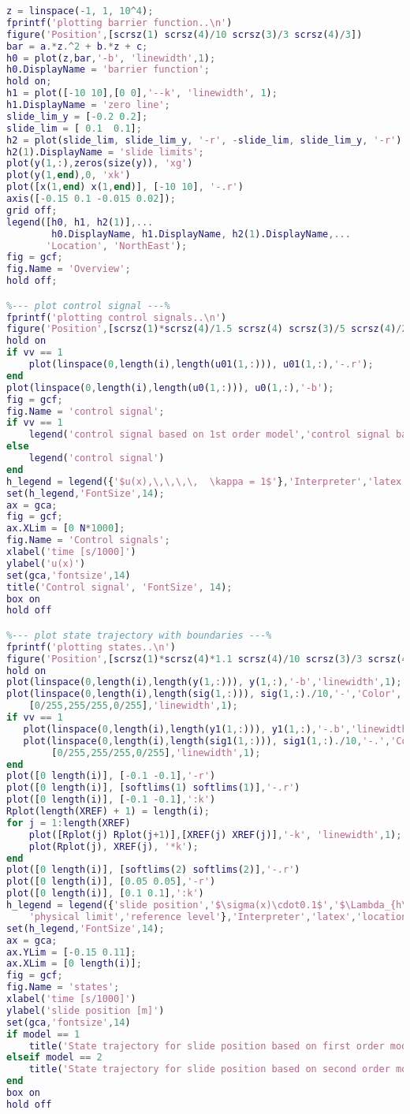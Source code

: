 \begin{lstlisting}[language=matlab]
%--- plot Barrier function ---%
z = linspace(-1, 1, 10^4);
fprintf('plotting barrier function..\n')
figure('Position',[scrsz(1) scrsz(4)/10 scrsz(3)/3 scrsz(4)/3])
bar = a.*z.^2 + b.*z + c;
h0 = plot(z,bar,'-b', 'linewidth',1);
h0.DisplayName = 'barrier function';
hold on;
h1 = plot([-10 10],[0 0],'--k', 'linewidth', 1);
h1.DisplayName = 'zero line';
slide_lim_y = [-0.2 0.2]; 
slide_lim = [ 0.1  0.1];
h2 = plot(slide_lim, slide_lim_y, '-r', -slide_lim, slide_lim_y, '-r');
h2(1).DisplayName = 'slide limits';
plot(y(1,:),zeros(size(y)), 'xg')
plot(y(1,end),0, 'xk')
plot([x(1,end) x(1,end)], [-10 10], '-.r')
axis([-0.15 0.1 -0.015 0.02]);
grid off;
legend([h0, h1, h2(1)],...
        h0.DisplayName, h1.DisplayName, h2(1).DisplayName,...
       'Location', 'NorthEast');
fig = gcf;
fig.Name = 'Overview';
hold off;

%--- plot control signal ---%
fprintf('plotting control signals..\n')
figure('Position',[scrsz(1)*scrsz(4)/1.5 scrsz(4) scrsz(3)/5 scrsz(4)/2.8])
hold on
if vv == 1
    plot(linspace(0,length(i),length(u01(1,:))), u01(1,:),'-.r');
end
plot(linspace(0,length(i),length(u0(1,:))), u0(1,:),'-b');
fig = gcf;
fig.Name = 'control signal';
if vv == 1
    legend('control signal based on 1st order model','control signal based on 2nd order model')
else
    legend('control signal')
end
h_legend = legend({'$u(x),\,\,\,\,  \kappa = 1$'},'Interpreter','latex');
set(h_legend,'FontSize',14);
ax = gca;
fig = gcf;
ax.XLim = [0 N*1000];
fig.Name = 'Control signals';
xlabel('time [s/1000]')
ylabel('u(x)')
set(gca,'fontsize',14)
title('Control signal', 'FontSize', 14);
box on
hold off

%--- plot state trajectory with boundaries ---%
fprintf('plotting states..\n')
figure('Position',[scrsz(1)*scrsz(4)*1.1 scrsz(4)/10 scrsz(3)/3 scrsz(4)/3])
hold on
plot(linspace(0,length(i),length(y(1,:))), y(1,:),'-b','linewidth',1);
plot(linspace(0,length(i),length(sig(1,:))), sig(1,:)./10,'-','Color',...
    [0/255,255/255,0/255],'linewidth',1);
if vv == 1
   plot(linspace(0,length(i),length(y1(1,:))), y1(1,:),'-.b','linewidth',1);
   plot(linspace(0,length(i),length(sig1(1,:))), sig1(1,:)./10,'-.','Color',...
        [0/255,255/255,0/255],'linewidth',1);
end
plot([0 length(i)], [-0.1 -0.1],'-r')
plot([0 length(i)], [softlims(1) softlims(1)],'-.r')
plot([0 length(i)], [-0.1 -0.1],':k')
Rplot(length(XREF) + 1) = length(i);
for j = 1:length(XREF)
    plot([Rplot(j) Rplot(j+1)],[XREF(j) XREF(j)],'-k', 'linewidth',1);
    plot(Rplot(j), XREF(j), '*k');
end
plot([0 length(i)], [softlims(2) softlims(2)],'-.r')
plot([0 length(i)], [0.05 0.05],'-r')
plot([0 length(i)], [0.1 0.1],':k')
h_legend = legend({'slide position','$\sigma(x)\cdot0.1$','$\Lambda_{h\pm}$','$\Lambda_{s\pm}$',...
    'physical limit','reference level'},'Interpreter','latex','location','southeast');
set(h_legend,'FontSize',14);
ax = gca;
ax.YLim = [-0.15 0.11];
ax.XLim = [0 length(i)];
fig = gcf;
fig.Name = 'states';
xlabel('time [s/1000]')
ylabel('slide position [m]')
set(gca,'fontsize',14)
if model == 1
    title('State trajectory for slide position based on first order model', 'FontSize', 14);
elseif model == 2
    title('State trajectory for slide position based on second order model', 'FontSize', 14);
end    
box on
hold off


\end{lstlisting}

